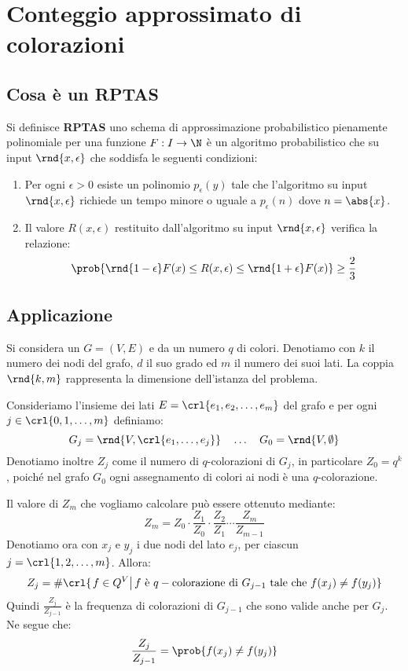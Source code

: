 \documentclass[\main/main.tex]{subfiles}
\begin{document}
\section{Conteggio approssimato di colorazioni}
\subsection{Cosa è un RPTAS}
\begin{definition}[RPTAS]
  Si definisce \textbf{RPTAS} uno schema di approssimazione probabilistico pienamente polinomiale per una funzione \(F: I \rightarrow \N \) è un algoritmo probabilistico che su input \(\rnd{x, \epsilon}\) che soddisfa le seguenti condizioni:
  \begin{enumerate}
    \item Per ogni \(\epsilon>0\) esiste un polinomio \(p_{\epsilon}(y)\) tale che l'algoritmo su input \(\rnd{x, \epsilon}\) richiede un tempo minore o uguale a \(p_{\epsilon}(n)\) dove \(n = \abs{x}\).
    \item Il valore \(R(x, \epsilon)\) restituito dall'algoritmo su input \(\rnd{x, \epsilon}\) verifica la relazione:
          \[
            \prob{\rnd{1-\epsilon}F(x) \leq R(x, \epsilon) \leq \rnd{1+\epsilon}F(x)} \geq \frac{2}{3}
          \]
  \end{enumerate}
\end{definition}

\subsection{Applicazione}
Si considera un \(G=(V, E)\) e da un numero \(q\) di colori. Denotiamo con \(k\) il numero dei nodi del grafo, \(d\) il suo grado ed \(m\) il numero dei suoi lati. La coppia \(\rnd{k, m}\) rappresenta la dimensione dell'istanza del problema.

Consideriamo l'insieme dei lati \(E = \crl{e_1, e_2, \ldots, e_m}\) del grafo e per ogni \(j \in \crl{0, 1, \ldots, m}\) definiamo:
\[
  G_j = \rnd{V, \crl{e_1, \ldots, e_j}} \quad \ldots \quad G_0 = \rnd{V, \emptyset}
\]
Denotiamo inoltre \(Z_j\) come il numero di \(q\)-colorazioni di \(G_j\), in particolare \(Z_0 = q^k\), poiché nel grafo \(G_0\) ogni assegnamento di colori ai nodi è una \(q\)-colorazione.

Il valore di \(Z_m\) che vogliamo calcolare può essere ottenuto mediante:
\[
  Z_m = Z_0 \cdot \frac{Z_1}{Z_0} \cdot \frac{Z_2}{Z_1} \cdots \frac{Z_m}{Z_{m-1}}
\]
Denotiamo ora con \(x_j\) e \(y_j\) i due nodi del lato \(e_j\), per ciascun \(j = \crl{1, 2, \ldots, m}\). Allora:
\[
  Z_j = \#\crl{\left. f \in Q^V \right\rvert f \text{ è }q-\text{colorazione di }G_{j-1}\text{ tale che }f(x_j)\neq f(y_j)}
\]
Quindi \(\frac{Z_j}{Z_{j-1}}\) è la frequenza di colorazioni di \(G_{j-1}\) che sono valide anche per \(G_j\).
Ne segue che:
\[
  \frac{Z_j}{Z_{j-1}} = \prob{f(x_j)\neq f(y_j)}
\]
\end{document}

